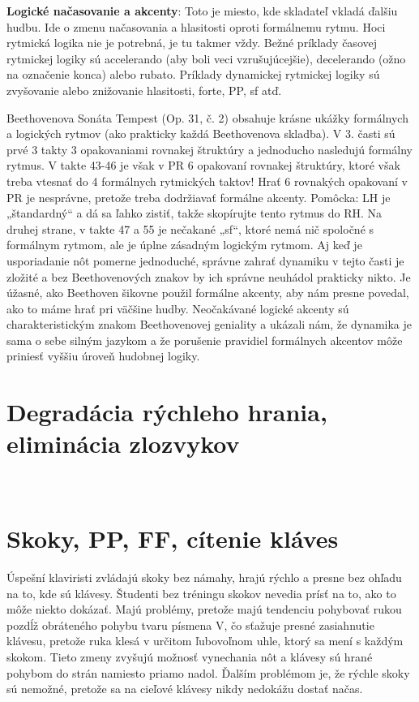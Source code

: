 \documentclass[11pt,a4paper]{book}
\begin{document}
\textbf{Logické načasovanie a akcenty}: Toto je miesto, kde skladateľ vkladá ďalšiu hudbu. Ide o zmenu načasovania a hlasitosti oproti formálnemu rytmu. Hoci rytmická logika nie je potrebná, je tu takmer vždy. Bežné príklady časovej rytmickej logiky sú accelerando (aby boli veci vzrušujúcejšie), decelerando (ožno na označenie konca) alebo rubato. Príklady dynamickej rytmickej logiky sú zvyšovanie alebo znižovanie hlasitosti, forte, PP, sf atď.

Beethovenova Sonáta Tempest (Op. 31, č. 2) obsahuje krásne ukážky formálnych a logických rytmov (ako prakticky každá Beethovenova skladba). V 3. časti sú prvé 3 takty 3 opakovaniami rovnakej štruktúry a jednoducho nasledujú formálny rytmus. V takte 43-46 je však v PR 6 opakovaní rovnakej štruktúry, ktoré však treba vtesnať do 4 formálnych rytmických taktov! Hrať 6 rovnakých opakovaní v PR je nesprávne, pretože treba dodržiavať formálne akcenty. Pomôcka: LH je „štandardný“ a dá sa ľahko zistiť, takže skopírujte tento rytmus do RH. Na druhej strane, v takte 47 a 55 je nečakané „sf“, ktoré nemá nič spoločné s formálnym rytmom, ale je úplne zásadným logickým rytmom. Aj keď je usporiadanie nôt pomerne jednoduché, správne zahrať dynamiku v tejto časti je zložité a bez Beethovenových znakov by ich správne neuhádol prakticky nikto. Je úžasné, ako Beethoven šikovne použil formálne akcenty, aby nám presne povedal, ako to máme hrať pri väčšine hudby. Neočakávané logické akcenty sú charakteristickým znakom Beethovenovej geniality a ukázali nám, že dynamika je sama o sebe silným jazykom a že porušenie pravidiel formálnych akcentov môže priniesť vyššiu úroveň hudobnej logiky.

\section{Degradácia rýchleho hrania, eliminácia zlozvykov}\label{s:fast-degradation}
\ 

\section{Skoky, PP, FF, cítenie kláves}\label{s:jumps}
Úspešní klaviristi zvládajú skoky bez námahy, hrajú rýchlo a presne bez ohľadu na to, kde sú klávesy. Študenti bez tréningu skokov nevedia prísť na to, ako to môže niekto dokázať. Majú problémy, pretože majú tendenciu pohybovať rukou pozdĺž obráteného pohybu tvaru písmena V, čo sťažuje presné zasiahnutie klávesu, pretože ruka klesá v určitom ľubovoľnom uhle, ktorý sa mení s každým skokom. Tieto zmeny zvyšujú možnosť vynechania nôt a klávesy sú hrané pohybom do strán namiesto priamo nadol. Ďalším problémom je, že rýchle skoky sú nemožné, pretože sa na cieľové klávesy nikdy nedokážu dostať načas.
\end{document}
